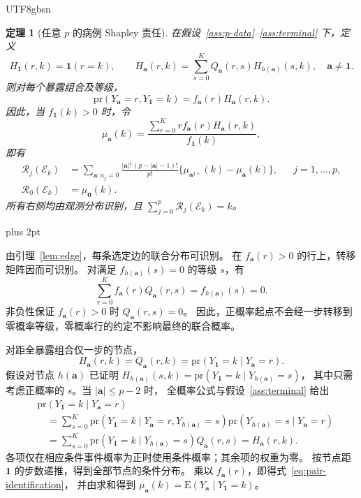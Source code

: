 \documentclass[11pt,a4paper]{article}
\makeatletter
\newcommand{\headingweight}{\ifPDFTeX\mdseries\else\bfseries\fi}
\theoremstyle{report}
\newtheorem{theorem}{定理}
\renewenvironment{proof}[1][证明]{\par\pushQED{\qed}\normalfont
  \topsep=6pt plus 2pt\relax\trivlist
  \item[\hskip\labelsep{\headingweight #1。}]\ignorespaces}
  {\popQED\endtrivlist\@endpefalse}
\newcommand{\pr}{\mathrm{pr}}
\newcommand{\E}{\mathrm E}
\newcommand{\avec}{\boldsymbol a}
\newcommand{\zero}{\boldsymbol 0}
\newcommand{\one}{\boldsymbol 1}
\makeatother
\begin{document}
\begin{CJK*}{UTF8}{gbsn}
\begin{theorem}[任意 $p$ 的病例 Shapley 责任]\label{thm:general}
在假设~\ref{ass:p-data}--\ref{ass:terminal} 下，定义
\begin{equation}\label{eq:h-recursion}
H_{\one}(r,k)=\mathbf1(r=k),\qquad
H_{\avec}(r,k)=
\sum_{s=0}^{K}Q_{\avec}(r,s)H_{h(\avec)}(s,k),
\quad \avec\ne\one.
\end{equation}
则对每个暴露组合及等级，
\begin{equation}\label{eq:pair-identification}
\pr(Y_{\avec}=r,Y_{\one}=k)=f_{\avec}(r)H_{\avec}(r,k).
\end{equation}
因此，当 $f_{\one}(k)>0$ 时，令
\begin{equation}\label{eq:mu}
\mu_{\avec}(k)=
\frac{\sum_{r=0}^{K}r f_{\avec}(r)H_{\avec}(r,k)}
     {f_{\one}(k)},
\end{equation}
即有
\begin{equation}\label{eq:general-r}
\begin{aligned}
\mathcal R_j(\mathcal E_k)
 &=\sum_{\avec:a_j=0}
   \frac{|\avec|!\,(p-|\avec|-1)!}{p!}
   \{\mu_{\avec^{j+}}(k)-\mu_{\avec}(k)\},
       &&j=1,\ldots,p,\\
\mathcal R_0(\mathcal E_k)&=\mu_{\zero}(k).
\end{aligned}
\end{equation}
所有右侧均由观测分布识别，且
$\sum_{j=0}^{p}\mathcal R_j(\mathcal E_k)=k$。
\end{theorem}

\begin{proof}
由引理~\ref{lem:edge}，每条选定边的联合分布可识别。
在 $f_{\avec}(r)>0$ 的行上，转移矩阵因而可识别。
对满足 $f_{h(\avec)}(s)=0$ 的等级 $s$，有
\[
\sum_{r=0}^{K}f_{\avec}(r)Q_{\avec}(r,s)
=f_{h(\avec)}(s)=0.
\]
非负性保证 $f_{\avec}(r)>0$ 时 $Q_{\avec}(r,s)=0$。
因此，正概率起点不会经一步转移到零概率等级，零概率行的约定不影响最终的联合概率。

对距全暴露组合仅一步的节点，
\[
H_{\avec}(r,k)=Q_{\avec}(r,k)
=\pr(Y_{\one}=k\mid Y_{\avec}=r).
\]
假设对节点 $h(\avec)$ 已证明
$H_{h(\avec)}(s,k)=\pr(Y_{\one}=k\mid Y_{h(\avec)}=s)$，
其中只需考虑正概率的 $s$。当 $|\avec|\le p-2$ 时，
全概率公式与假设~\ref{ass:terminal} 给出
\[
\begin{aligned}
&\pr(Y_{\one}=k\mid Y_{\avec}=r)\\
&\quad=\sum_{s=0}^{K}
 \pr(Y_{\one}=k\mid Y_{\avec}=r,Y_{h(\avec)}=s)
 \pr(Y_{h(\avec)}=s\mid Y_{\avec}=r)\\
&\quad=\sum_{s=0}^{K}
 \pr(Y_{\one}=k\mid Y_{h(\avec)}=s)Q_{\avec}(r,s)
 =H_{\avec}(r,k).
\end{aligned}
\]
各项仅在相应条件事件概率为正时使用条件概率；其余项的权重为零。
按节点距 $\one$ 的步数递推，得到全部节点的条件分布。
乘以 $f_{\avec}(r)$，即得式~\eqref{eq:pair-identification}，
并由求和得到 $\mu_{\avec}(k)=\E(Y_{\avec}\mid Y_{\one}=k)$。


\end{proof}
\end{CJK*}
\end{document}
